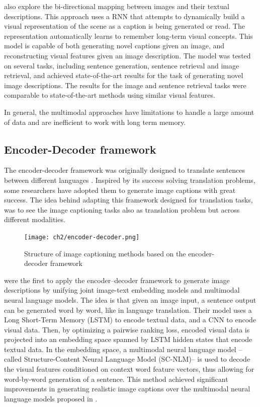 \citet{Chen2015} also explore the bi-directional mapping between images and their textual descriptions. This approach uses a RNN that attempts to dynamically build a visual representation of the scene as a caption is being generated or read. The representation automatically learns to remember long-term visual concepts. This model is capable of both generating novel captions given an image, and reconstructing visual features given an image description. The model was tested on several tasks, including sentence generation, sentence retrieval and image retrieval, and achieved state-of-the-art results for the task of generating novel image descriptions. The results for the image and sentence retrieval tasks were comparable to state-of-the-art methods using similar visual features.

In general, the multimodal approaches have limitations to handle a large amount of data and are inefficient to work with long term memory.

\subsection{Encoder-Decoder framework}

The encoder-decoder framework was originally designed to translate sentences between different languages \citep{Kalchbrenner2013, Sutskever2014, Cho2014}. Inspired by its success solving translation problems, some researchers have adopted them to generate image captions with great success. The idea behind adapting this framework designed for translation tasks, was to see the image captioning tasks also as translation problem but across different modalities. 

\begin{figure}[hpt]
	\centering
	\texttt{[image: ch2/encoder-decoder.png]}
	\caption{Structure of image captioning methods based on the encoder-decoder framework}
	\label{fig:encoder-decoder}
\end{figure}

\citet{Kiros2014b} were the first to apply the encoder–decoder framework to generate image descriptions by unifying joint image-text embedding models and multimodal neural language models. The idea is that given an image input, a sentence output can be generated word by word, like in language translation. Their model uses a Long Short-Term Memory (LSTM) \citep{Hochreiter1997} to encode textual data, and a CNN to encode visual data. Then, by optimizing a pairwise ranking loss, encoded visual data is projected into an embedding space spanned by LSTM  hidden states that encode textual data. In the embedding space, a multimodal neural language model --called Structure-Content Neural Language Model (SC-NLM)-- is used to decode the visual features conditioned on context word feature vectors, thus allowing for word-by-word generation of a sentence. This method achieved significant improvements in generating realistic image captions over the multimodal neural language models proposed in \citep{Kiros2014a}.

